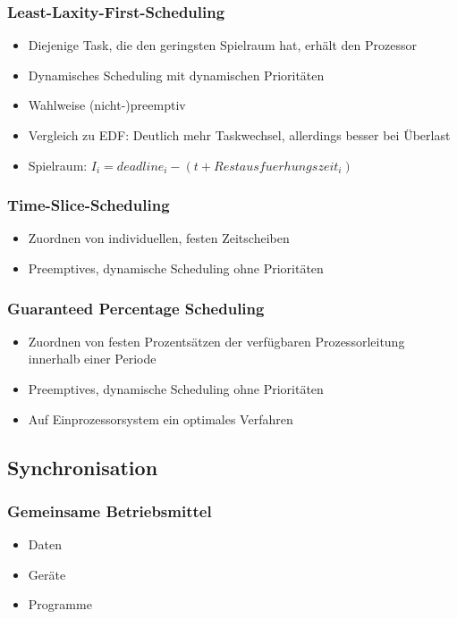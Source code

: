 \subsubsection{Least-Laxity-First-Scheduling}
\begin{itemize}
	\item Diejenige Task, die den geringsten Spielraum hat, erhält den Prozessor
	\item Dynamisches Scheduling mit dynamischen Prioritäten
	\item Wahlweise (nicht-)preemptiv
	\item Vergleich zu EDF: Deutlich mehr Taskwechsel, allerdings besser bei Überlast
	\item Spielraum: \(I_i = deadline_i -(t+Restausfuerhungszeit_i)\)
\end{itemize}

\subsubsection{Time-Slice-Scheduling}
\begin{itemize}
	\item Zuordnen von individuellen, festen Zeitscheiben
	\item Preemptives, dynamische Scheduling ohne Prioritäten
\end{itemize}

\subsubsection{Guaranteed Percentage Scheduling}
\begin{itemize}
	\item Zuordnen von festen Prozentsätzen der verfügbaren Prozessorleitung innerhalb einer Periode
	\item Preemptives, dynamische Scheduling ohne Prioritäten
	\item Auf Einprozessorsystem ein optimales Verfahren
\end{itemize}


\subsection{Synchronisation}

\subsubsection{Gemeinsame Betriebsmittel}
\begin{itemize}
	\item Daten
	\item Geräte
	\item Programme
\end{itemize}

